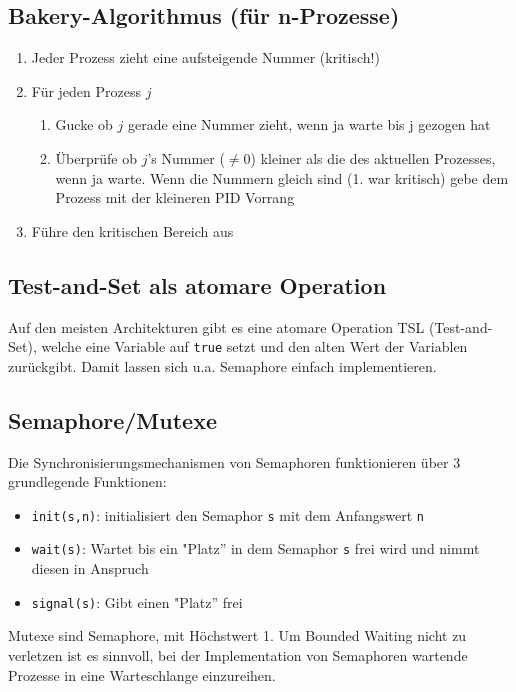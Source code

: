 \documentclass[11pt]{scrartcl}
\begin{document}
\subsection{Bakery-Algorithmus (für n-Prozesse)}
\begin{enumerate}
\item{Jeder Prozess zieht eine aufsteigende Nummer (kritisch!)}
\item{Für jeden Prozess $j$}
\begin{enumerate}
\item{Gucke ob $j$ gerade eine Nummer zieht, wenn ja warte bis j gezogen hat}
\item{Überprüfe ob $j$'s Nummer ($\neq 0$) kleiner als die des aktuellen Prozesses, wenn ja warte. Wenn die Nummern gleich sind (1. war kritisch) gebe dem Prozess mit der kleineren PID Vorrang}
\end{enumerate}
\item{Führe den kritischen Bereich aus}
\end{enumerate}

\subsection{Test-and-Set als atomare Operation}
Auf den meisten Architekturen gibt es eine atomare Operation TSL (Test-and-Set), welche eine Variable auf \texttt{true} setzt und den alten Wert der Variablen zurückgibt. Damit lassen sich u.a. Semaphore einfach implementieren.

\subsection{Semaphore/Mutexe}
Die Synchronisierungsmechanismen von Semaphoren funktionieren über 3 grundlegende Funktionen:

\begin{itemize}
\item{\texttt{init(s,n)}: initialisiert den Semaphor \texttt{s} mit dem Anfangswert \texttt{n}}
\item{\texttt{wait(s)}: Wartet bis ein "Platz'' in dem Semaphor \texttt{s} frei wird und nimmt diesen in Anspruch}
\item{\texttt{signal(s)}: Gibt einen "Platz'' frei}
\end{itemize}

Mutexe sind Semaphore, mit Höchstwert 1. Um Bounded Waiting nicht zu verletzen ist es sinnvoll, bei der Implementation von Semaphoren wartende Prozesse in eine Warteschlange einzureihen.
\end{document}
